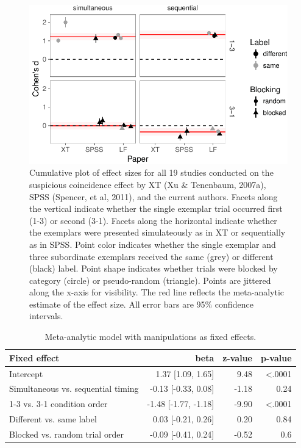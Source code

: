 \documentclass[english,floatsintext,man]{apa6}
\newcounter{author}
\theoremstyle{definition}
\theoremstyle{definition}
\theoremstyle{remark}
\begin{document}
\begin{figure}
\centering
\includegraphics{xtmem_files/figure-latex/unnamed-chunk-4-1.pdf}
\caption{\label{fig:unnamed-chunk-4}Cumulative plot of effect sizes for all
19 studies conducted on the suspicious coincidence effect by XT (Xu \&
Tenenbaum, 2007a), SPSS (Spencer, et al, 2011), and the current authors.
Facets along the vertical indicate whether the single exemplar trial
occurred first (1-3) or second (3-1). Facets along the horizontal
indicate whether the exemplars were presented simulateously as in XT or
sequentially as in SPSS. Point color indicates whether the single
exemplar and three subordinate exemplars received the same (grey) or
different (black) label. Point shape indicates whether trials were
blocked by category (circle) or pseudo-random (triangle). Points are
jittered along the x-axis for visibility. The red line reflects the
meta-analytic estimate of the effect size. All error bars are 95\%
confidence intervals.}
\end{figure}

\begin{table}

\caption{\label{tab:unnamed-chunk-5}Meta-analytic model with manipulations as fixed effects.}
\centering
\fontsize{12}{14}\selectfont
\begin{tabular}[t]{lrrr}
\toprule
Fixed effect & beta & z-value & p-value\\
\midrule
Intercept & 1.37 [1.09, 1.65] & 9.48 & <.0001\\
Simultaneous vs. sequential timing & -0.13 [-0.33, 0.08] & -1.18 & 0.24\\
1-3 vs. 3-1 condition order & -1.48 [-1.77, -1.18] & -9.90 & <.0001\\
Different vs. same label & 0.03 [-0.21, 0.26] & 0.20 & 0.84\\
Blocked vs. random trial order & -0.09 [-0.41, 0.24] & -0.52 & 0.6\\
\bottomrule
\end{tabular}
\end{table}
\end{document}
